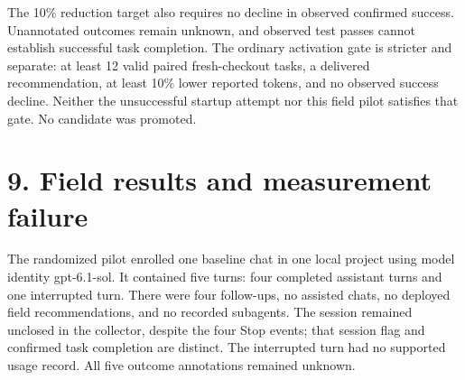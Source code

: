 \documentclass[11pt]{article}
\begin{document}
The 10\% reduction target also requires no decline in observed confirmed success. Unannotated outcomes remain unknown, and observed test passes cannot establish successful task completion. The ordinary activation gate is stricter and separate: at least 12 valid paired fresh-checkout tasks, a delivered recommendation, at least 10\% lower reported tokens, and no observed success decline. Neither the unsuccessful startup attempt nor this field pilot satisfies that gate. No candidate was promoted.

\section*{9. Field results and measurement failure}
The randomized pilot enrolled one baseline chat in one local project using model identity gpt-6.1-sol. It contained five turns: four completed assistant turns and one interrupted turn. There were four follow-ups, no assisted chats, no deployed field recommendations, and no recorded subagents. The session remained unclosed in the collector, despite the four Stop events; that session flag and confirmed task completion are distinct. The interrupted turn had no supported usage record. All five outcome annotations remained unknown.
\end{document}
